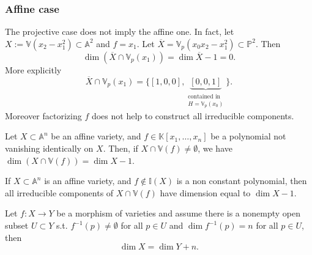 \subsubsection{Affine case}
\begin{rem}[]
	The projective case does not imply the affine one.
	In fact, let $X := \mathbb{V}\left( x_2 - x_1^2 \right) \subset \mathbb{A}^{2}$ and $f = x_1$.
	Let $\overline{X} = \mathbb{V}_p\left( x_0x_2 - x_1^2 \right) \subset \mathbb{P}^{2}$.
	Then
	\begin{equation}
		\dim \left( \overline{X} \cap \mathbb{V}_p\left( x_1 \right) \right) =
		\dim \overline{X} - 1 = 0
	.\end{equation} 
	More explicitly 
	\begin{equation}
	\overline{X} \cap \mathbb{V}_p\left( x_1 \right) = 
	\big\{ \left[ 1, 0, 0 \right], 
	\underbrace{\left[ 0 , 0, 1 \right]}_{\begin{matrix}{\scriptstyle \text{contained in}}\\
	{\scriptstyle H = \mathbb{V}_p\left( x_0 \right)}\end{matrix}} \big\}
	.\end{equation} 
	Moreover factorizing $f$ does not help to construct all irreducible components.
\end{rem}

\begin{prop}
	Let $X \subset \mathbb{A}^{n}$ be an affine variety, and
	$f \in \mathbb{K}\left[x_1, \ldots, x_n \right]$ be a polynomial not vanishing identically on $X$.
	Then, if $X \cap \mathbb{V}\left( f \right) \neq \emptyset$, we have
	$\dim \left( X \cap \mathbb{V}\left( f \right) \right) = \dim X - 1$.
\end{prop} 

\begin{cor}
	If $X \subset \mathbb{A}^{n}$ is an affine variety, and
	$f \notin \mathbb{I}(X)$ is a non constant polynomial, then
	all irreducible components of $X \cap \mathbb{V}\left( f \right)$ have dimension equal to
	$\dim X - 1$.
\end{cor} 

\begin{thm}
	Let $f: X \to Y$ be a morphism of varieties and assume there is a nonempty
	open subset $U \subset Y$ s.t. $f^{-1}(p) \neq \emptyset$ for all $p \in U$
	and $\dim f^{-1}(p) = n$ for all $p \in U$, then
	\begin{equation}
	\dim X = \dim Y + n
	.\end{equation} 
\end{thm}

